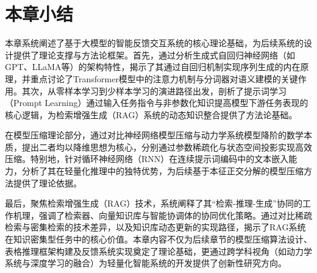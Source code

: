 \section{本章小结}
本章系统阐述了基于大模型的智能反馈交互系统的核心理论基础，为后续系统的设计提供了理论支撑与方法论框架。首先，通过分析生成式自回归神经网络（如GPT、LLaMA等）的架构特性，揭示了其通过自回归机制实现序列生成的内在原理，并重点讨论了Transformer模型中的注意力机制与分词器对语义建模的关键作用。其次，从零样本学习到少样本学习的演进路径出发，剖析了提示词学习（Prompt Learning）通过输入任务指令与非参数化知识提高模型下游任务表现的核心逻辑，为检索增强生成（RAG）系统的动态知识整合提供了方法论基础。

在模型压缩理论部分，通过对比神经网络模型压缩与动力学系统模型降阶的数学本质，提出二者均以降维思想为核心，分别通过参数稀疏化与状态空间投影实现高效压缩。特别地，针对循环神经网络（RNN）在连续提示词编码中的文本嵌入能力，分析了其在轻量化推理中的独特优势，为后续基于本征正交分解的模型压缩方法提供了理论依据。  

最后，聚焦检索增强生成（RAG）技术，系统阐释了其“检索-推理-生成”协同的工作机理，强调了检索器、向量知识库与智能协调体的协同优化策略。通过对比稀疏检索与密集检索的技术差异，以及知识库动态更新的实现路径，揭示了RAG系统在知识密集型任务中的核心价值。本章内容不仅为后续章节的模型压缩算法设计、表格推理框架构建及反馈系统实现奠定了理论基础，更通过跨学科视角（如动力学系统与深度学习的融合）为轻量化智能系统的开发提供了创新性研究方向。


